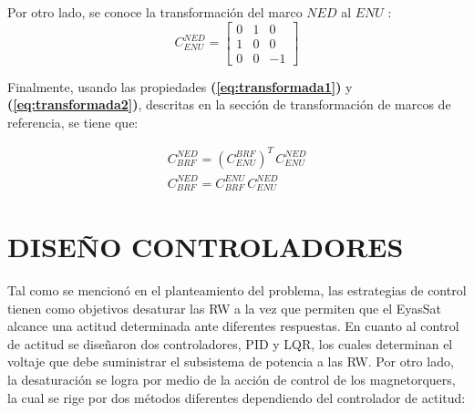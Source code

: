 Por otro lado, se conoce la transformación del marco $NED$ al $ENU$ :
$$
C_{ENU}^{NED}=\left[\begin{array}{ccc}
	0 &1 &0 \\
	1 & 0 & 0 \\
	0 & 0 &-1
\end{array}\right]
$$

Finalmente, usando las propiedades \textbf{(\ref{eq:transformada1})} y \textbf{(\ref{eq:transformada2})}, descritas en la sección de transformación de marcos de referencia, se tiene que:

\begin{gather}
	C_{BRF}^{NED} = \left(C_{ENU}^{BRF}\right)^T\,C_{ENU}^{NED}\\[10pt]
	C_{BRF}^{NED} = C_{BRF}^{ENU}\,C_{ENU}^{NED}
\end{gather}
	



\newpage
\section{DISEÑO CONTROLADORES}

Tal como se mencionó en el planteamiento del problema, las estrategias de control tienen como objetivos desaturar las RW a la vez que permiten que el EyasSat alcance una actitud determinada ante diferentes respuestas. En cuanto al control de actitud se diseñaron dos controladores, PID y LQR, los cuales determinan el voltaje que  debe suministrar el subsistema de potencia a las RW. Por otro lado, la desaturación se logra por medio de la acción de control de los magnetorquers, la cual se rige por dos métodos diferentes dependiendo del controlador de actitud:

